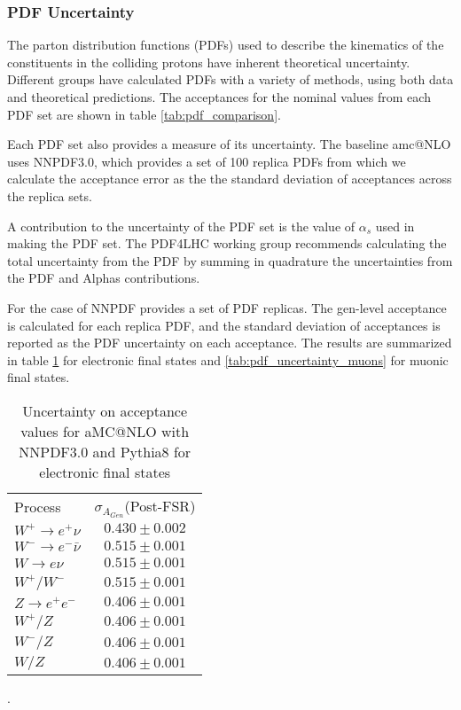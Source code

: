 \documentclass[aps,prd,final,twocolumn,letterpaper]{revtex4}
\begin{document}
			\subsubsection{PDF Uncertainty}
			The parton distribution functions (PDFs) used to describe the kinematics of the constituents in the colliding protons have inherent theoretical uncertainty. Different groups have calculated PDFs with a variety of methods, using both data and theoretical predictions. The acceptances for the nominal values from each PDF set are shown in table \ref{tab:pdf_comparison}.
			
			Each PDF set also provides a measure of its uncertainty. The baseline amc@NLO uses NNPDF3.0, which provides a set of 100 replica PDFs from which we calculate the acceptance error as the the standard deviation of acceptances across the replica sets. 
			
			A contribution to the uncertainty of the PDF set is the value of $\alpha_{s}$ used in making the PDF set. The PDF4LHC working group recommends calculating the total uncertainty from the PDF by summing in quadrature the uncertainties from the PDF and Alphas contributions. 
			
			For the case of NNPDF provides a set of PDF replicas. The gen-level acceptance is calculated for each replica PDF, and the standard deviation of acceptances is reported as the PDF uncertainty on each acceptance. The results are summarized in table \ref{tab:pdf_uncertainty_electrons} for electronic final states and \ref{tab:pdf_uncertainty_muons} for muonic final states.
			
			\begin{table}
				\centering
				\begin{tabular}{l  c}
					Process 							& $\sigma_{A_{Gen}}$(Post-FSR) 		\\
					$W^{+}\rightarrow e^{+}\nu$ 		& $0.430 \pm 0.002$ 		\\
					$W^{-}\rightarrow e^{-}\bar{\nu}$ 	& $0.515\pm 0.001$ 			\\		
					$W\rightarrow e\nu$ 				& $0.515\pm 0.001$ 			\\
					$W^{+}/W^{-}$					 	& $0.515\pm 0.001$ 			\\
					$Z\rightarrow e^{+}e^{-}$ 			& $0.406\pm 0.001$ 			\\
					$W^{+}/Z$				 			& $0.406\pm 0.001$ 			\\
					$W^{-}/Z$				 			& $0.406\pm 0.001$ 			\\
					$W/Z$				 				& $0.406\pm 0.001$ 			\\					
				\end{tabular}
				\caption{Uncertainty on acceptance values for aMC@NLO with NNPDF3.0 and Pythia8 for electronic final states}.
				\label{tab:pdf_uncertainty_electrons}
			\end{table}
			
\end{document}
